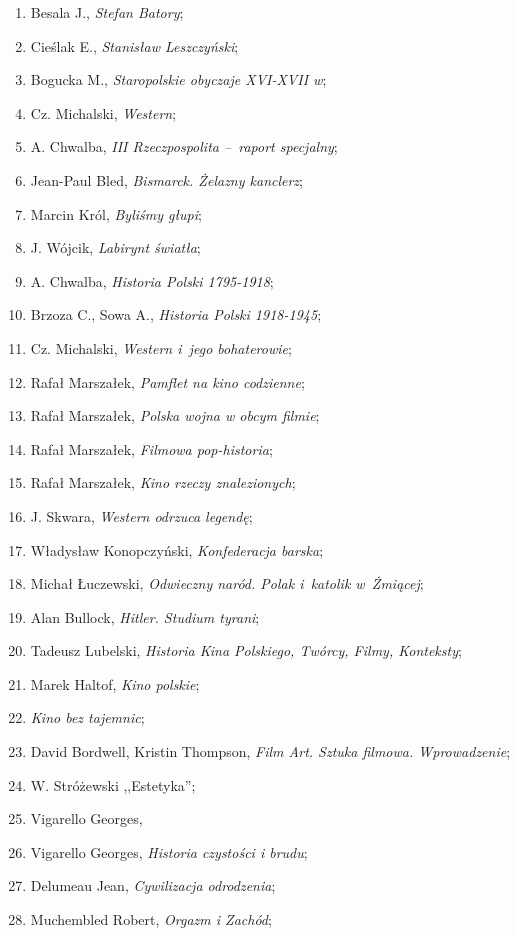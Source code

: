 \documentclass[a4paper,11pt]{article}
\begin{document}
\begin{enumerate}
\item Besala J., \emph{Stefan Batory};
\item Cieślak E., \emph{Stanisław Leszczyński};
\item Bogucka M., \emph{Staropolskie obyczaje XVI-XVII w};
\item Cz. Michalski, \emph{Western};
\item A. Chwalba, \emph{III Rzeczpospolita --~raport specjalny};
\item Jean-Paul Bled, \emph{Bismarck. Żelazny kanclerz};
\item Marcin Król, \emph{Byliśmy głupi};
\item J. Wójcik, \emph{Labirynt światła};
\item A. Chwalba, \emph{Historia Polski 1795-1918};
\item Brzoza C., Sowa A., \emph{Historia Polski 1918-1945};
\item Cz. Michalski, \emph{Western i~jego bohaterowie};
\item Rafał Marszałek, \emph{Pamflet na kino codzienne};
\item Rafał Marszałek, \emph{Polska wojna w obcym filmie};
\item Rafał Marszałek, \emph{Filmowa pop-historia};
\item Rafał Marszałek, \emph{Kino rzeczy znalezionych};
\item J. Skwara, \emph{Western odrzuca legendę};
\item Władysław Konopczyński, \emph{Konfederacja barska};
\item Michał Łuczewski, \emph{Odwieczny naród. Polak i~katolik
    w~Żmiącej};
\item Alan Bullock, \emph{Hitler. Studium tyrani};
\item Tadeusz Lubelski, \emph{Historia Kina Polskiego, Twórcy, Filmy,
    Konteksty};
\item Marek Haltof, \emph{Kino polskie};
\item \emph{Kino bez tajemnic};
\item David Bordwell, Kristin Thompson, \emph{Film Art. Sztuka
    filmowa. Wprowadzenie};
\item W. Stróżewski ,,Estetyka'';
\item Vigarello Georges, \emph{}
\item Vigarello Georges, \emph{Historia czystości i brudu};
\item Delumeau Jean, \emph{Cywilizacja odrodzenia};
\item Muchembled Robert, \emph{Orgazm i Zachód};

\end{enumerate}
\end{document}
